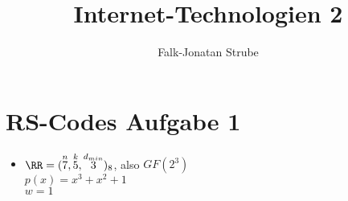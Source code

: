 \documentclass{scrreprt}
\title{Internet-Technologien 2}
\author{Falk-Jonatan Strube}
\begin{document}

\section*{RS-Codes Aufgabe 1}
\begin{itemize}
\item $\RR = (\overset{n}{7}, \overset{k}{5}, \overset{d_{min}}{3})_8$, also $GF(2^3)$\\
$p(x)=x^3+x^2+1$\\
$w=1$
\end{itemize}
\end{document}
